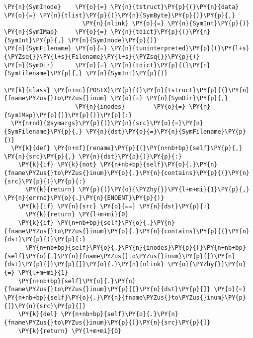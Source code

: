 \begin{Verbatim}[commandchars=\\\{\}]
\PY{n}{SymInode}    \PY{o}{=} \PY{n}{tstruct}\PY{p}{(}\PY{n}{data}  \PY{o}{=} \PY{n}{tlist}\PY{p}{(}\PY{n}{SymByte}\PY{p}{)}\PY{p}{,}
                      \PY{n}{nlink} \PY{o}{=} \PY{n}{SymInt}\PY{p}{)}
\PY{n}{SymIMap}     \PY{o}{=} \PY{n}{tdict}\PY{p}{(}\PY{n}{SymInt}\PY{p}{,} \PY{n}{SymInode}\PY{p}{)}
\PY{n}{SymFilename} \PY{o}{=} \PY{n}{tuninterpreted}\PY{p}{(}\PY{l+s}{\PYZsq{}}\PY{l+s}{Filename}\PY{l+s}{\PYZsq{}}\PY{p}{)}
\PY{n}{SymDir}      \PY{o}{=} \PY{n}{tdict}\PY{p}{(}\PY{n}{SymFilename}\PY{p}{,} \PY{n}{SymInt}\PY{p}{)}

\PY{k}{class} \PY{n+nc}{POSIX}\PY{p}{(}\PY{n}{tstruct}\PY{p}{(}\PY{n}{fname\PYZus{}to\PYZus{}inum} \PY{o}{=} \PY{n}{SymDir}\PY{p}{,}
                    \PY{n}{inodes}        \PY{o}{=} \PY{n}{SymIMap}\PY{p}{)}\PY{p}{)}\PY{p}{:}
  \PY{n+nd}{@symargs}\PY{p}{(}\PY{n}{src}\PY{o}{=}\PY{n}{SymFilename}\PY{p}{,} \PY{n}{dst}\PY{o}{=}\PY{n}{SymFilename}\PY{p}{)}
  \PY{k}{def} \PY{n+nf}{rename}\PY{p}{(}\PY{n+nb+bp}{self}\PY{p}{,} \PY{n}{src}\PY{p}{,} \PY{n}{dst}\PY{p}{)}\PY{p}{:}
    \PY{k}{if} \PY{k}{not} \PY{n+nb+bp}{self}\PY{o}{.}\PY{n}{fname\PYZus{}to\PYZus{}inum}\PY{o}{.}\PY{n}{contains}\PY{p}{(}\PY{n}{src}\PY{p}{)}\PY{p}{:}
      \PY{k}{return} \PY{p}{(}\PY{o}{\PYZhy{}}\PY{l+m+mi}{1}\PY{p}{,} \PY{n}{errno}\PY{o}{.}\PY{n}{ENOENT}\PY{p}{)}
    \PY{k}{if} \PY{n}{src} \PY{o}{==} \PY{n}{dst}\PY{p}{:}
      \PY{k}{return} \PY{l+m+mi}{0}
    \PY{k}{if} \PY{n+nb+bp}{self}\PY{o}{.}\PY{n}{fname\PYZus{}to\PYZus{}inum}\PY{o}{.}\PY{n}{contains}\PY{p}{(}\PY{n}{dst}\PY{p}{)}\PY{p}{:}
      \PY{n+nb+bp}{self}\PY{o}{.}\PY{n}{inodes}\PY{p}{[}\PY{n+nb+bp}{self}\PY{o}{.}\PY{n}{fname\PYZus{}to\PYZus{}inum}\PY{p}{[}\PY{n}{dst}\PY{p}{]}\PY{p}{]}\PY{o}{.}\PY{n}{nlink} \PY{o}{\PYZhy{}}\PY{o}{=} \PY{l+m+mi}{1}
    \PY{n+nb+bp}{self}\PY{o}{.}\PY{n}{fname\PYZus{}to\PYZus{}inum}\PY{p}{[}\PY{n}{dst}\PY{p}{]} \PY{o}{=} \PY{n+nb+bp}{self}\PY{o}{.}\PY{n}{fname\PYZus{}to\PYZus{}inum}\PY{p}{[}\PY{n}{src}\PY{p}{]}
    \PY{k}{del} \PY{n+nb+bp}{self}\PY{o}{.}\PY{n}{fname\PYZus{}to\PYZus{}inum}\PY{p}{[}\PY{n}{src}\PY{p}{]}
    \PY{k}{return} \PY{l+m+mi}{0}
\end{Verbatim}
